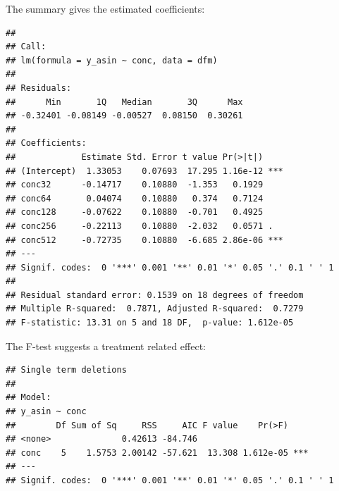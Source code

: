 The summary gives the estimated coefficients:
\begin{knitrout}
\color{fgcolor}\begin{kframe}
\begin{alltt}
\end{alltt}
\begin{verbatim}
## 
## Call:
## lm(formula = y_asin ~ conc, data = dfm)
## 
## Residuals:
##      Min       1Q   Median       3Q      Max 
## -0.32401 -0.08149 -0.00527  0.08150  0.30261 
## 
## Coefficients:
##             Estimate Std. Error t value Pr(>|t|)    
## (Intercept)  1.33053    0.07693  17.295 1.16e-12 ***
## conc32      -0.14717    0.10880  -1.353   0.1929    
## conc64       0.04074    0.10880   0.374   0.7124    
## conc128     -0.07622    0.10880  -0.701   0.4925    
## conc256     -0.22113    0.10880  -2.032   0.0571 .  
## conc512     -0.72735    0.10880  -6.685 2.86e-06 ***
## ---
## Signif. codes:  0 '***' 0.001 '**' 0.01 '*' 0.05 '.' 0.1 ' ' 1
## 
## Residual standard error: 0.1539 on 18 degrees of freedom
## Multiple R-squared:  0.7871,	Adjusted R-squared:  0.7279 
## F-statistic: 13.31 on 5 and 18 DF,  p-value: 1.612e-05
\end{verbatim}
\end{kframe}
\end{knitrout}

The F-test suggests a treatment related effect:
\begin{knitrout}
\color{fgcolor}\begin{kframe}
\begin{alltt}
  \hlstd{=} \hlstd{)}
\end{alltt}
\begin{verbatim}
## Single term deletions
## 
## Model:
## y_asin ~ conc
##        Df Sum of Sq     RSS     AIC F value    Pr(>F)    
## <none>              0.42613 -84.746                      
## conc    5    1.5753 2.00142 -57.621  13.308 1.612e-05 ***
## ---
## Signif. codes:  0 '***' 0.001 '**' 0.01 '*' 0.05 '.' 0.1 ' ' 1
\end{verbatim}
\end{kframe}
\end{knitrout}

